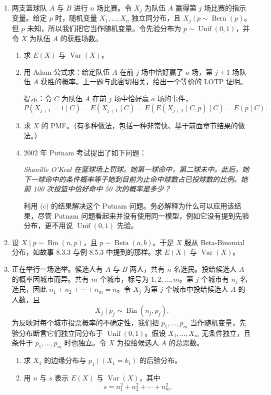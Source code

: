 \documentclass[UTF8, 12pt, fontset=fandol, oneside]{ctexart}
\begin{document}
\begin{enumerate}
  \item 两支篮球队 $A$ 与 $B$ 进行 $n$ 场比赛。令 $X_j$ 为队伍 $A$ 赢得第 $j$ 场比赛的指示变量。给定 $p$ 时，随机变量 $X_1,\ldots,X_n$ 独立同分布，且 $X_j\mid p\sim\operatorname{Bern}(p)$。但 $p$ 未知，所以我们把它当作随机变量。令先验分布为 $p\sim\operatorname{Unif}(0,1)$，并令 $X$ 为队伍 $A$ 的获胜场数。
  \begin{enumerate}
    \item[(a)] 求 $E(X)$ 与 $\operatorname{Var}(X)$。
    \item[(b)] 用 Adam 公式求：给定队伍 $A$ 在前 $j$ 场中恰好赢了 $a$ 场，第 $j+1$ 场队伍 $A$ 获胜的概率。上一题与此密切相关，给出一个等价的 LOTP 证明。

    \noindent 提示：令 $C$ 为队伍 $A$ 在前 $j$ 场中恰好赢 $a$ 场的事件，
    \[
      P(X_{j+1}=1\mid C)=E(X_{j+1}\mid C)
      =E(E(X_{j+1}\mid C,p)\mid C)=E(p\mid C).
    \]
    \item[(c)] 求 $X$ 的 PMF。（有多种做法，包括一种非常快、基于前面章节结果的做法。）
    \item[(d)] 2002 年 Putnam 考试提出了如下问题：

    \textit{Shanille O'Keal 在篮球场上罚球。她第一球命中，第二球未中。此后，她下一球命中的条件概率等于她到目前为止命中球数占已投球数的比例。她前 100 次投篮中恰好命中 50 次的概率是多少？}

    利用 (c) 的结果解决这个 Putnam 问题。务必解释为什么可以应用该结果，尽管 Putnam 问题看起来并没有使用同一模型，例如它没有提到先验分布，更不用说 $\operatorname{Unif}(0,1)$ 先验。
  \end{enumerate}

  \item 设 $X\mid p\sim\operatorname{Bin}(n,p)$，且 $p\sim\operatorname{Beta}(a,b)$。于是 $X$ 服从 Beta-Binomial 分布，如故事 8.3.3 与例 8.5.3 中提到的那样。求 $E(X)$ 与 $\operatorname{Var}(X)$。

  \item 正在举行一场选举。候选人有 $A$ 与 $B$ 两人，共有 $n$ 名选民。投给候选人 $A$ 的概率因城市而异。共有 $m$ 个城市，标号为 $1,2,\ldots,m$。第 $j$ 个城市有 $n_j$ 名选民，因此 $n_1+n_2+\cdots+n_m=n$。令 $X_j$ 为第 $j$ 个城市中投给候选人 $A$ 的人数，且
  \[
    X_j\mid p_j\sim\operatorname{Bin}(n_j,p_j).
  \]
  为反映对每个城市投票概率的不确定性，我们把 $p_1,\ldots,p_m$ 当作随机变量，先验分布断言它们独立同分布于 $\operatorname{Unif}(0,1)$。假设 $X_1,\ldots,X_m$ 无条件独立，且条件于 $p_1,\ldots,p_m$ 时也独立。令 $X$ 为投给候选人 $A$ 的总票数。
  \begin{enumerate}
    \item[(a)] 求 $X_1$ 的边缘分布与 $p_1\mid (X_1=k_1)$ 的后验分布。
    \item[(b)] 用 $n$ 与 $s$ 表示 $E(X)$ 与 $\operatorname{Var}(X)$，其中
    \[
      s=n_1^2+n_2^2+\cdots+n_m^2.
    \]
  \end{enumerate}
\end{enumerate}
\end{document}
